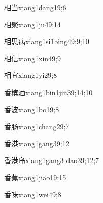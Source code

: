 \begin{verbete}{相当}{xiang1dang1}{9;6}
\end{verbete}

\begin{verbete}{相聚}{xiang1ju4}{9;14}
\end{verbete}

\begin{verbete}{相思病}{xiang1si1bing4}{9;9;10}
\end{verbete}

\begin{verbete}{相信}{xiang1xin4}{9;9}
\end{verbete}

\begin{verbete}{相宜}{xiang1yi2}{9;8}
\end{verbete}

\begin{verbete}{香槟酒}{xiang1bin1jiu3}{9;14;10}
\end{verbete}

\begin{verbete}{香波}{xiang1bo1}{9;8}
\end{verbete}

\begin{verbete}{香肠}{xiang1chang2}{9;7}
\end{verbete}

\begin{verbete}{香港}{xiang1gang3}{9;12}
\end{verbete}

\begin{verbete}{香港岛}{xiang1gang3 dao3}{9;12;7}
\end{verbete}

\begin{verbete}{香蕉}{xiang1jiao1}{9;15}
\end{verbete}

\begin{verbete}{香味}{xiang1wei4}{9;8}
\end{verbete}

